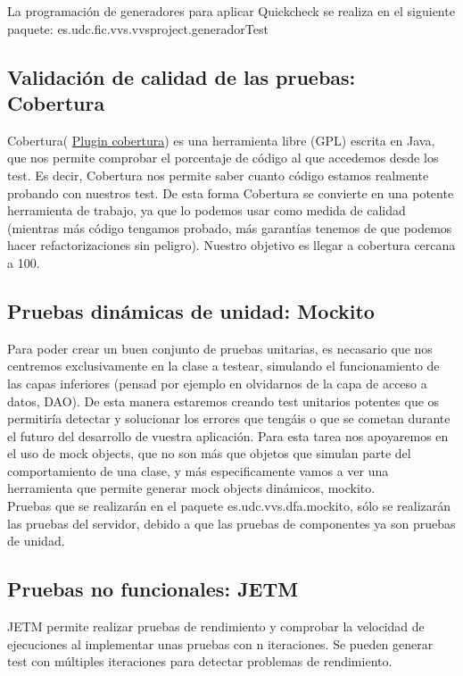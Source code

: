 \documentclass[DIV=calc,paper=a4,fontsize=11pt,onecolumn]{scrartcl} %
\begin{document}
	La programación de generadores para aplicar Quickcheck se realiza en el siguiente paquete: es.udc.fic.vvs.vvsproject.generadorTest
	
	\subsection{Validación de calidad de las pruebas: Cobertura}
	Cobertura( \href{http://cobertura.sourceforge.net/}{Plugin cobertura}) es una herramienta libre (GPL) escrita en Java, que nos permite comprobar el porcentaje de código al que accedemos desde los test. Es decir, Cobertura nos permite saber cuanto código estamos realmente probando con nuestros test.
	De esta forma Cobertura se convierte en una potente herramienta de trabajo, ya que lo podemos usar como medida de calidad (mientras más código tengamos probado, más garantías tenemos de que podemos hacer refactorizaciones sin peligro).
	Nuestro objetivo es llegar a cobertura cercana a 100.
	
	\subsection{Pruebas dinámicas de unidad: Mockito}
	Para poder crear un buen conjunto de pruebas unitarias, es necasario que nos centremos exclusivamente en la clase a testear, simulando el funcionamiento de las capas inferiores (pensad por ejemplo en olvidarnos de la capa de acceso a datos, DAO). De esta manera estaremos creando test unitarios potentes que os permitiría detectar y solucionar los errores que tengáis o que se cometan durante el futuro del desarrollo de vuestra aplicación.
	Para esta tarea nos apoyaremos en el uso de mock objects, que no son más que objetos que simulan parte del comportamiento de una clase, y más especificamente vamos a ver una herramienta que permite generar mock objects dinámicos, mockito. \\
	
	Pruebas que se realizarán en el paquete es.udc.vvs.dfa.mockito, sólo se realizarán las pruebas del servidor, debido a que las pruebas de componentes ya son pruebas de unidad.
	\subsection{Pruebas no funcionales: JETM}
	JETM permite realizar pruebas de rendimiento y comprobar la velocidad de ejecuciones al implementar unas pruebas con n iteraciones. Se pueden generar test con múltiples iteraciones para detectar problemas de rendimiento. \\
	
\end{document}

